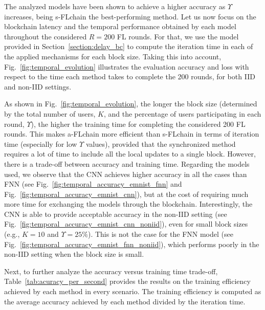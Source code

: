 \documentclass[lettersize,journal]{IEEEtran}
\begin{document}
The analyzed models have been shown to achieve a higher accuracy as $\Upsilon$ increases, being s-FLchain the best-performing method. Let us now focus on the blockchain latency and the temporal performance obtained by each model throughout the considered $R=200$ FL rounds. For that, we use the model provided in Section~\ref{section:delay_bc} to compute the iteration time in each of the applied mechanisms for each block size. Taking this into account, Fig.~\ref{fig:temporal_evolution} illustrates the evaluation accuracy and loss with respect to the time each method takes to complete the 200 rounds, for both IID and non-IID settings.

As shown in Fig.~\ref{fig:temporal_evolution}, the longer the block size (determined by the total number of users, $K$, and the percentage of users participating in each round, $\Upsilon$), the higher the training time for completing the considered 200 FL rounds. This makes a-FLchain more efficient than s-FLchain in terms of iteration time (especially for low $\Upsilon$ values), provided that the synchronized method requires a lot of time to include all the local updates to a single block. However, there is a trade-off between accuracy and training time. Regarding the models used, we observe that the CNN achieves higher accuracy in all the cases than FNN (see Fig.~\ref{fig:temporal_accuracy_emnist_fnn} and Fig.~\ref{fig:temporal_accuracy_emnist_cnn}), but at the cost of requiring much more time for exchanging the models through the blockchain. Interestingly, the CNN is able to provide acceptable accuracy in the non-IID setting (see Fig.~\ref{fig:temporal_accuracy_emnist_cnn_noniid}), even for small block sizes (e.g., $K=10$ and $\Upsilon=25\%$). This is not the case for the FNN model (see Fig.~\ref{fig:temporal_accuracy_emnist_fnn_noniid}), which performs poorly in the non-IID setting when the block size is small.

Next, to further analyze the accuracy versus training time trade-off, Table~\ref{tab:acuracy_per_second} provides the results on the training efficiency achieved by each method in every scenario. The training efficiency is computed as the average accuracy achieved by each method divided by the iteration time.
\end{document}
